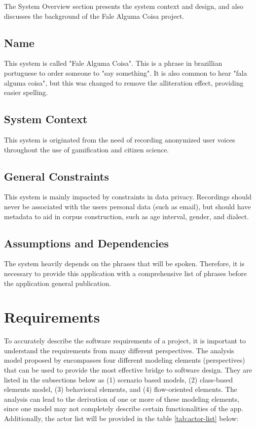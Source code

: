 The System Overview section presents the system context and design, and also discusses the background of the Fale Alguma Coisa project.

\subsection{Name}

This system is called "Fale Alguma Coisa". This is a phrase in brazillian portuguese to order someone to "say something". It is also common to hear "fala alguma coisa", but this was changed to remove the alliteration effect, providing easier spelling.

\subsection{System Context}

This system is originated from the need of recording anonymized user voices throughout the use of gamification and citizen science.

\subsection{General Constraints}

This system is mainly impacted by constraints in data privacy. Recordings should never be associated with the users personal data (such as email), but should have metadata to aid in corpus construction, such as age interval, gender, and dialect.

\subsection{Assumptions and Dependencies}

The system heavily depends on the phrases that will be spoken. Therefore, it is necessary to provide this application with a comprehensive list of phrases before the application general publication.

\section{Requirements}

To accurately describe the software requirements of a project, it is important to understand the requirements from many different perspectives. The analysis model proposed by \cite{pressman2014software} encompasses four different modeling elements (perspectives) that can be used to provide the most effective bridge to software design. They are listed in the subsections below as (1) scenario based models, (2) class-based elements model, (3) behavioral elements, and (4) flow-oriented elements. The analysis can lead to the derivation of one or more of these modeling elements, since one model may not completely describe certain functionalities of the app. Additionally, the actor list will be provided in the table \ref{tab:actor-list} below:

